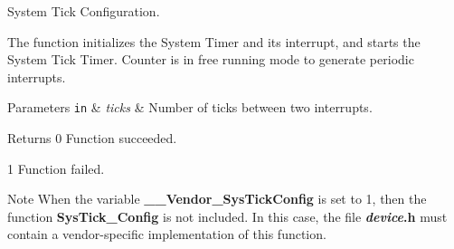 System Tick Configuration. 

The function initializes the System Timer and its interrupt, and starts the System Tick Timer. Counter is in free running mode to generate periodic interrupts.


\begin{DoxyParams}[1]{Parameters}
\mbox{\tt in}  & {\em ticks} & Number of ticks between two interrupts.\\
\hline
\end{DoxyParams}
\begin{DoxyReturn}{Returns}
0 Function succeeded. 

1 Function failed.
\end{DoxyReturn}
\begin{DoxyNote}{Note}
When the variable {\bfseries \-\_\-\-\_\-\-Vendor\-\_\-\-Sys\-Tick\-Config} is set to 1, then the function {\bfseries Sys\-Tick\-\_\-\-Config} is not included. In this case, the file {\bfseries {\itshape device}.h} must contain a vendor-\/specific implementation of this function. 
\end{DoxyNote}
